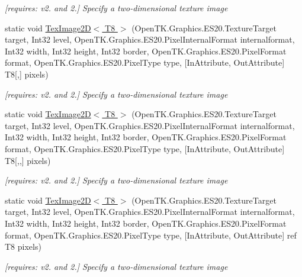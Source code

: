 \begin{DoxyCompactItemize}
\begin{DoxyCompactList}\small\item\em \mbox{[}requires\-: v2. and 2.\mbox{]} Specify a two-\/dimensional texture image \end{DoxyCompactList}\item 
static void \hyperlink{class_open_t_k_1_1_graphics_1_1_e_s20_1_1_g_l_a81141ef828354829ac798918188d22d7}{Tex\-Image2\-D$<$ T8 $>$} (Open\-T\-K.\-Graphics.\-E\-S20.\-Texture\-Target target, Int32 level, Open\-T\-K.\-Graphics.\-E\-S20.\-Pixel\-Internal\-Format internalformat, Int32 width, Int32 height, Int32 border, Open\-T\-K.\-Graphics.\-E\-S20.\-Pixel\-Format format, Open\-T\-K.\-Graphics.\-E\-S20.\-Pixel\-Type type, \mbox{[}In\-Attribute, Out\-Attribute\mbox{]} T8\mbox{[},\mbox{]} pixels)
\begin{DoxyCompactList}\small\item\em \mbox{[}requires\-: v2. and 2.\mbox{]} Specify a two-\/dimensional texture image \end{DoxyCompactList}\item 
static void \hyperlink{class_open_t_k_1_1_graphics_1_1_e_s20_1_1_g_l_a30d0584980fe0e6d848492b311dfe8ca}{Tex\-Image2\-D$<$ T8 $>$} (Open\-T\-K.\-Graphics.\-E\-S20.\-Texture\-Target target, Int32 level, Open\-T\-K.\-Graphics.\-E\-S20.\-Pixel\-Internal\-Format internalformat, Int32 width, Int32 height, Int32 border, Open\-T\-K.\-Graphics.\-E\-S20.\-Pixel\-Format format, Open\-T\-K.\-Graphics.\-E\-S20.\-Pixel\-Type type, \mbox{[}In\-Attribute, Out\-Attribute\mbox{]} T8\mbox{[},,\mbox{]} pixels)
\begin{DoxyCompactList}\small\item\em \mbox{[}requires\-: v2. and 2.\mbox{]} Specify a two-\/dimensional texture image \end{DoxyCompactList}\item 
static void \hyperlink{class_open_t_k_1_1_graphics_1_1_e_s20_1_1_g_l_acf7041ff6a212a24f62cdf2dbd4d0d89}{Tex\-Image2\-D$<$ T8 $>$} (Open\-T\-K.\-Graphics.\-E\-S20.\-Texture\-Target target, Int32 level, Open\-T\-K.\-Graphics.\-E\-S20.\-Pixel\-Internal\-Format internalformat, Int32 width, Int32 height, Int32 border, Open\-T\-K.\-Graphics.\-E\-S20.\-Pixel\-Format format, Open\-T\-K.\-Graphics.\-E\-S20.\-Pixel\-Type type, \mbox{[}In\-Attribute, Out\-Attribute\mbox{]} ref T8 pixels)
\begin{DoxyCompactList}\small\item\em \mbox{[}requires\-: v2. and 2.\mbox{]} Specify a two-\/dimensional texture image \end{DoxyCompactList}\item 

\end{DoxyCompactItemize}
